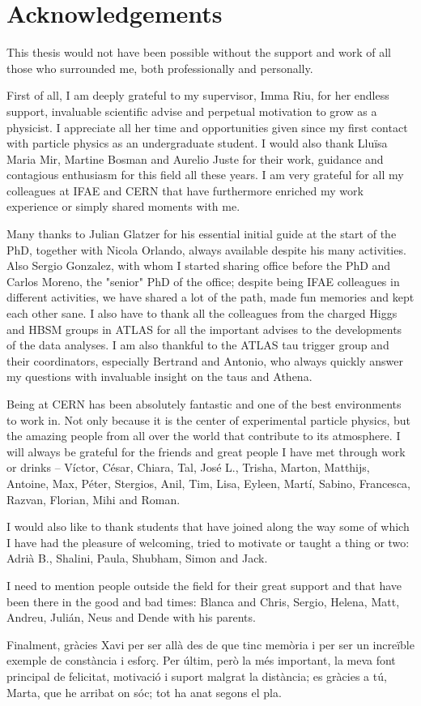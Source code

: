 \chapter*{Acknowledgements}

This thesis would not have been possible without the support and work of all those who surrounded me, both
professionally and personally.

First of all, I am deeply grateful to my supervisor, Imma Riu, for her endless support, invaluable scientific advise and perpetual motivation to grow as a physicist. I appreciate all her time and opportunities given since my first contact with particle physics as an undergraduate student. I would also thank Lluïsa Maria Mir, Martine Bosman and Aurelio Juste for their work, guidance and contagious enthusiasm for this field all these years. I am very grateful for all my colleagues at IFAE and CERN that have furthermore enriched my work experience or simply shared moments with me.

Many thanks to Julian Glatzer for his essential initial guide at the start of the PhD, together with Nicola Orlando, always available despite his many activities. Also Sergio Gonzalez, with whom I started sharing office before the PhD and Carlos Moreno, the "senior" PhD of the office; despite being IFAE colleagues in different activities, we have shared a lot of the path, made fun memories and kept each other sane. I also have to thank all the colleagues from the charged Higgs and HBSM groups in ATLAS for all the
important advises to the developments of the data analyses. I am also thankful to the ATLAS tau trigger group and their coordinators, especially Bertrand and Antonio, who always quickly answer my questions with invaluable insight on the taus and Athena.

Being at CERN has been absolutely fantastic and one of the best environments to work in. Not only because it is the center of experimental particle physics, but the amazing people from all over the world that contribute to its atmosphere. I will always be grateful for the friends and great people I have met through work or drinks -- Víctor, César, Chiara, Tal, José L., Trisha, Marton, Matthijs, Antoine, Max, Péter, Stergios, Anil, Tim, Lisa, Eyleen, Martí, Sabino, Francesca, Razvan, Florian, Mihi and Roman.

I would also like to thank students that have joined along the way some of which I have had the pleasure of welcoming, tried to motivate or taught a thing or two: Adrià B., Shalini, Paula, Shubham, Simon and Jack.

I need to mention people outside the field for their great support and that have been there in the good and bad times: Blanca and Chris, Sergio, Helena, Matt, Andreu, Julián, Neus and Dende with his parents.

Finalment, gràcies Xavi per ser allà des de que tinc memòria i per ser un increïble exemple de constància i esforç. Per últim, però la més important, la meva font principal de felicitat, motivació i suport malgrat la distància; es gràcies a tú, Marta, que he arribat on sóc; tot ha anat segons el pla.
